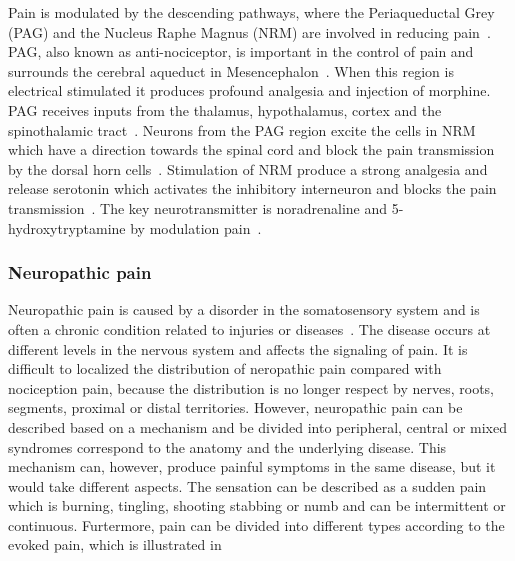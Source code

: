 Pain is modulated by the descending pathways, where the Periaqueductal Grey (PAG) and the Nucleus Raphe Magnus (NRM) are involved in reducing pain~\cite{Steeds2013}. PAG, also known as anti-nociceptor, is important in the control of pain and surrounds the cerebral aqueduct in Mesencephalon~\cite{Steeds2013}. When this region is electrical stimulated it produces profound analgesia and injection of morphine. PAG receives inputs from the thalamus, hypothalamus, cortex and the spinothalamic tract~\cite{Steeds2013}. Neurons from the PAG region excite the cells in NRM which have a direction towards the spinal cord and block the pain transmission by the dorsal horn cells~\cite{Steeds2013}. Stimulation of NRM produce a strong analgesia and release serotonin which activates the inhibitory interneuron and blocks the pain transmission~\cite{Steeds2013}. The key neurotransmitter is noradrenaline and 5-hydroxytryptamine by modulation pain~\cite{Steeds2013}. 

\subsubsection{Neuropathic pain}
Neuropathic pain is caused by a disorder in the somatosensory system and is often a chronic condition related to injuries or diseases~\cite{Mindruta2013}. The disease occurs at different levels in the nervous system and affects the signaling of pain. It is difficult to localized the distribution of neropathic pain compared with nociception pain, because the distribution is no longer respect by nerves, roots, segments, proximal or distal territories. However, neuropathic pain can be described based on a mechanism and be divided into peripheral, central or mixed syndromes correspond to the anatomy and the underlying disease. This mechanism can, however, produce painful symptoms in the same disease, but it would take different aspects. The sensation can be described as a sudden pain which is burning, tingling, shooting stabbing or numb and can be intermittent or continuous. Furtermore, pain can be divided into different types according to the evoked pain, which is illustrated in 

